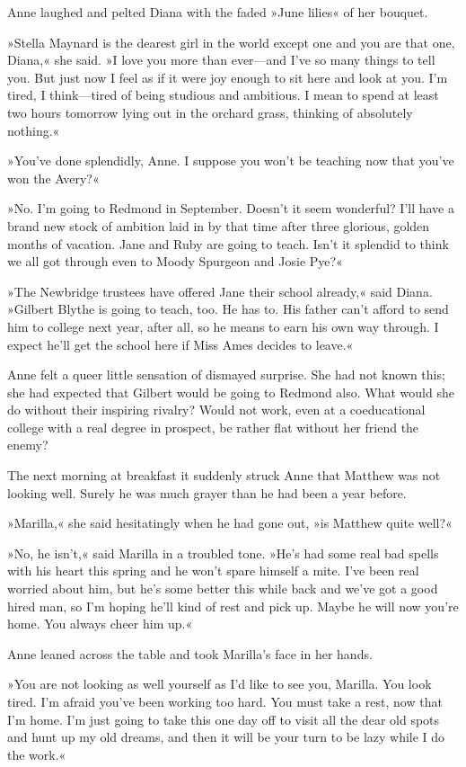 Anne laughed and pelted Diana with the faded »June lilies« of her bouquet.

»Stella Maynard is the dearest girl in the world except one and you are that one, Diana,« she said. »I love you more than ever—and I've so many things to tell you. But just now I feel as if it were joy enough to sit here and look at you. I'm tired, I think—tired of being studious and ambitious. I mean to spend at least two hours tomorrow lying out in the orchard grass, thinking of absolutely nothing.«

»You've done splendidly, Anne. I suppose you won't be teaching now that you've won the Avery?«

»No. I'm going to Redmond in September. Doesn't it seem wonderful? I'll have a brand new stock of ambition laid in by that time after three glorious, golden months of vacation. Jane and Ruby are going to teach. Isn't it splendid to think we all got through even to Moody Spurgeon and Josie Pye?«

»The Newbridge trustees have offered Jane their school already,« said Diana. »Gilbert Blythe is going to teach, too. He has to. His father can't afford to send him to college next year, after all, so he means to earn his own way through. I expect he'll get the school here if Miss Ames decides to leave.«

Anne felt a queer little sensation of dismayed surprise. She had not known this; she had expected that Gilbert would be going to Redmond also. What would she do without their inspiring rivalry? Would not work, even at a coeducational college with a real degree in prospect, be rather flat without her friend the enemy?

The next morning at breakfast it suddenly struck Anne that Matthew was not looking well. Surely he was much grayer than he had been a year before.

»Marilla,« she said hesitatingly when he had gone out, »is Matthew quite well?«

»No, he isn't,« said Marilla in a troubled tone. »He's had some real bad spells with his heart this spring and he won't spare himself a mite. I've been real worried about him, but he's some better this while back and we've got a good hired man, so I'm hoping he'll kind of rest and pick up. Maybe he will now you're home. You always cheer him up.«

Anne leaned across the table and took Marilla's face in her hands.

»You are not looking as well yourself as I'd like to see you, Marilla. You look tired. I'm afraid you've been working too hard. You must take a rest, now that I'm home. I'm just going to take this one day off to visit all the dear old spots and hunt up my old dreams, and then it will be your turn to be lazy while I do the work.«

